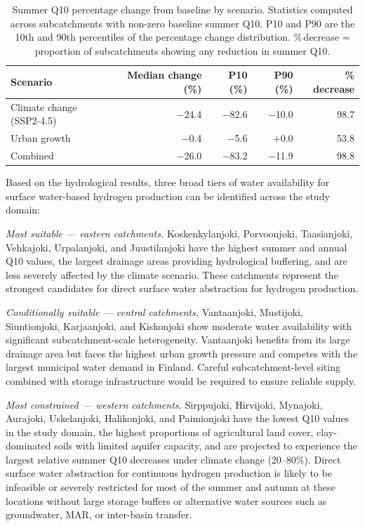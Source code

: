 \documentclass[draft]{agujournal2019}
\begin{document}
\begin{table}[htbp]
\caption{Summer Q10 percentage change from baseline by scenario. Statistics computed across subcatchments with non-zero baseline summer Q10. P10 and P90 are the 10th and 90th percentiles of the percentage change distribution. \%\,decrease = proportion of subcatchments showing any reduction in summer Q10.}
\label{tab:delta_summary}
\small
\begin{tabular}{lrrrr}
\toprule
Scenario & Median change (\%) & P10 (\%) & P90 (\%) & \% decrease \\
\midrule
Climate change (SSP2-4.5) & $-$24.4 & $-$82.6 & $-$10.0 & 98.7 \\
Urban growth              &  $-$0.4 &  $-$5.6 &   $+$0.0 & 53.8 \\
Combined                  & $-$26.0 & $-$83.2 & $-$11.9 & 98.8 \\
\bottomrule
\end{tabular}
\end{table}

Based on the hydrological results, three broad tiers of water availability for surface water-based hydrogen production can be identified across the study domain:

\textit{Most suitable — eastern catchments.} Koskenkylanjoki, Porvoonjoki, Taasianjoki, Vehkajoki, Urpalanjoki, and Juustilanjoki have the highest summer and annual Q10 values, the largest drainage areas providing hydrological buffering, and are less severely affected by the climate scenario. These catchments represent the strongest candidates for direct surface water abstraction for hydrogen production.

\textit{Conditionally suitable — central catchments.} Vantaanjoki, Mustijoki, Siuntionjoki, Karjaanjoki, and Kiskonjoki show moderate water availability with significant subcatchment-scale heterogeneity. Vantaanjoki benefits from its large drainage area but faces the highest urban growth pressure and competes with the largest municipal water demand in Finland. Careful subcatchment-level siting combined with storage infrastructure would be required to ensure reliable supply.

\textit{Most constrained — western catchments.} Sirppujoki, Hirvijoki, Mynajoki, Aurajoki, Uskelanjoki, Halikonjoki, and Paimionjoki have the lowest Q10 values in the study domain, the highest proportions of agricultural land cover, clay-dominated soils with limited aquifer capacity, and are projected to experience the largest relative summer Q10 decreases under climate change (20--80\%). Direct surface water abstraction for continuous hydrogen production is likely to be infeasible or severely restricted for most of the summer and autumn at these locations without large storage buffers or alternative water sources such as groundwater, MAR, or inter-basin transfer.
\end{document}
